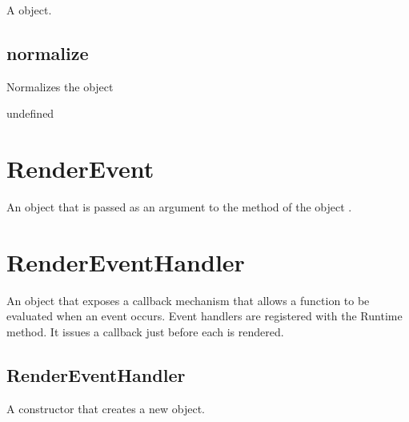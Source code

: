 \documentclass[letterpaper,12pt,english,openany,oneside]{sphinxmanual}
\begin{document}
\label{\detokenize{JS_3D_API:section-80}}\label{\detokenize{JS_3D_API:returns-77}}

A  object.


\subsection{normalize}
\label{\detokenize{JS_3D_API:normalize}}
Normalizes the  object

\label{\detokenize{JS_3D_API:syntax-77}}

\begin{sphinxVerbatim}[commandchars=\\\{\}]
\end{sphinxVerbatim}
\label{\detokenize{JS_3D_API:returns-78}}

undefined


\section{RenderEvent}
\label{\detokenize{JS_3D_API:renderevent}}
An object that is passed as an argument to the  method of the  object .

\label{\detokenize{JS_3D_API:properties-21}}


\section{RenderEventHandler}
\label{\detokenize{JS_3D_API:rendereventhandler}}
An object that exposes a callback mechanism that allows a function to be evaluated when an event occurs. Event handlers are registered with the Runtime  method. It issues a callback just before each  is rendered.


\subsection{RenderEventHandler}
\label{\detokenize{JS_3D_API:rendereventhandler-1}}\label{\detokenize{JS_3D_API:id24}}
A constructor that creates a new  object.
\end{document}
